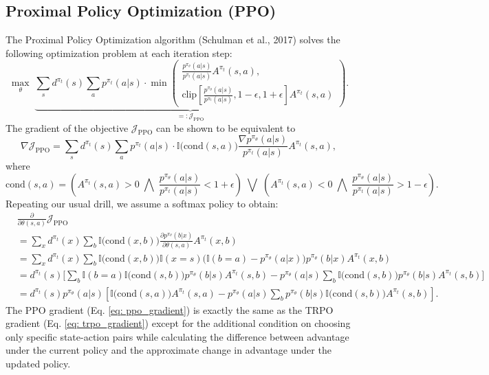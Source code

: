 \documentclass[a4paper, 10pt]{article}
\begin{document}
\subsection{Proximal Policy Optimization (PPO)}
The Proximal Policy Optimization algorithm (Schulman et al., 2017) solves the following optimization problem at each iteration step:
\begin{equation}
  \max_\theta \; \underbrace{\sum_s d^{\pi_t}(s) \sum_a p^{\pi_t}(a | s) \cdot \min \left( \begin{matrix} \frac{p^{\pi_\theta}(a | s)}{p^{\pi_t}(a | s)} A^{\pi_t}(s, a), \\ \text{clip} \left[\frac{p^{\pi_\theta}(a | s)}{p^{\pi_t}(a | s)}, 1 - \epsilon, 1 + \epsilon \right] A^{\pi_t}(s, a) \end{matrix} \right)}_{=: \mathcal{J}_{\text{PPO}}}.
\end{equation}
The gradient of the objective $\mathcal{J}_{\text{PPO}}$ can be shown to be equivalent to
\begin{equation}
  \nabla \mathcal{J}_{\text{PPO}} = \sum_s d^{\pi_t}(s) \sum_a p^{\pi_t}(a | s) \cdot \mathbb{I} \Big( \text{cond}(s, a) \Big) \frac{\nabla p^{\pi_\theta}(a | s)}{p^{\pi_t}(a | s)} A^{\pi_t}(s, a),
\end{equation}
where 
\begin{equation}
  \text{cond}(s, a) = \left( A^{\pi_t}(s, a) > 0 \;\bigwedge\; \frac{p^{\pi_\theta}(a | s)}{p^{\pi_t}(a | s)} < 1 + \epsilon \right) \;\bigvee\; \left( A^{\pi_t}(s, a) < 0 \;\bigwedge\; \frac{p^{\pi_\theta}(a | s)}{p^{\pi_t}(a | s)} > 1 - \epsilon \right).
\end{equation}
Repeating our usual drill, we assume a softmax policy to obtain:
\begin{align}
  & \frac{\partial}{\partial \theta(s, a)} \mathcal{J}_{\text{PPO}} \nonumber \\
  &= \sum_x d^{\pi_t}(x) \sum_b \mathbb{I} \Big( \text{cond}(x, b) \Big) \frac{\partial p^{\pi_\theta}(b | x)}{\partial \theta(s, a)} A^{\pi_t}(x, b) \nonumber \\
  &= \sum_x d^{\pi_t}(x) \sum_b \mathbb{I} \Big( \text{cond}(x, b) \Big) \mathbb{I}(x = s) \Big( \mathbb{I}(b = a) - p^{\pi_\theta}(a | x) \Big) p^{\pi_\theta}(b | x) A^{\pi_t}(x, b) \nonumber \\
  &= d^{\pi_t}(s) \Bigg[ \sum_b \mathbb{I}(b = a) \mathbb{I} \Big( \text{cond}(s, b) \Big) p^{\pi_\theta}(b | s) A^{\pi_t}(s, b) - p^{\pi_\theta}(a | s) \sum_b \mathbb{I} \Big( \text{cond}(s, b) \Big) p^{\pi_\theta}(b | s) A^{\pi_t}(s, b) \Bigg] \nonumber \\
    &= d^{\pi_t}(s) p^{\pi_\theta}(a | s) \left[ \mathbb{I} \Big( \text{cond}(s, a) \Big) A^{\pi_t}(s, a) - p^{\pi_\theta}(a | s) \sum_b p^{\pi_\theta}(b | s) \mathbb{I} \Big( \text{cond}(s, b) \Big) A^{\pi_t}(s, b) \right]. \label{eq: ppo_gradient}
\end{align}
The PPO gradient (Eq. \ref{eq: ppo_gradient}) is exactly the same as the TRPO gradient (Eq. \ref{eq: trpo_gradient}) except for the additional condition on choosing only specific state-action pairs while calculating the difference between advantage under the current policy and the approximate change in advantage under the updated policy.
\end{document}
